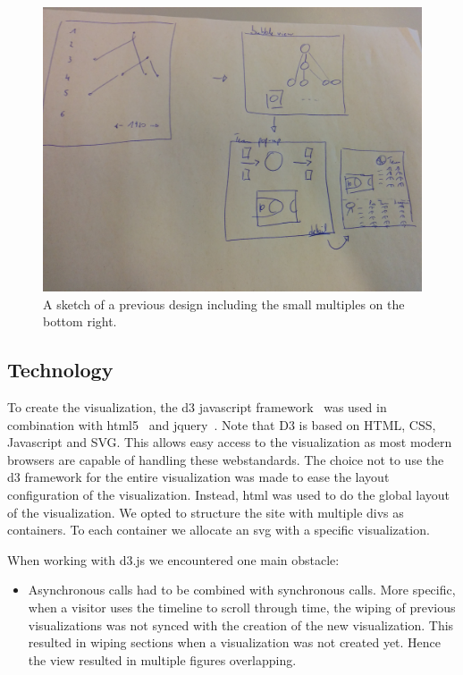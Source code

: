 \documentclass[]{sigchi}
\begin{document}
\begin{figure}
\centering
  \includegraphics[width=1.0\columnwidth]{figures/smallmultsketch}
  \caption{A sketch of a previous design including the small multiples on the
  bottom right.}
  \label{fig:smallmultsktech}
\end{figure}

\subsection{Technology}
To create the visualization, the d3 javascript framework~\cite{d3} was used in
combination with html5~\cite{html5} and jquery~\cite{jquery}. Note that D3 is
based on HTML, CSS, Javascript and SVG. This allows easy access to the
visualization as most modern browsers are capable of handling these
webstandards. The choice not to use the d3 framework for the entire
visualization was made to ease the layout configuration of the visualization.
Instead, html was used to do the global layout of the visualization. We opted to
structure the site with multiple divs as containers. To each container we
allocate an svg with a specific visualization.

When working with d3.js we encountered one main obstacle:
\begin{itemize}
        \item Asynchronous calls had to be combined with synchronous calls.
            More specific, when a visitor uses the timeline to scroll through
            time, the wiping of previous visualizations was not synced with the
            creation of the new visualization. This resulted in wiping sections
            when a visualization was not created yet. Hence the view resulted in
            multiple figures overlapping.
\end{itemize}
\end{document}
